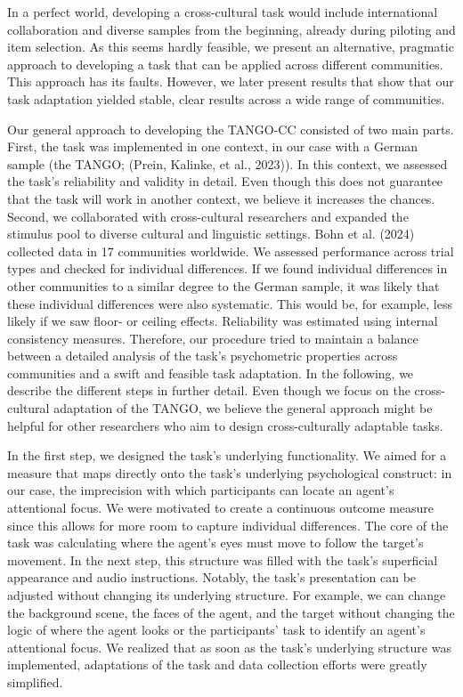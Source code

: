\documentclass[
  man,mask,floatsintext]{apa7}
\begin{document}
In a perfect world, developing a cross-cultural task would include international collaboration and diverse samples from the beginning, already during piloting and item selection. As this seems hardly feasible, we present an alternative, pragmatic approach to developing a task that can be applied across different communities. This approach has its faults. However, we later present results that show that our task adaptation yielded stable, clear results across a wide range of communities.

Our general approach to developing the TANGO-CC consisted of two main parts. First, the task was implemented in one context, in our case with a German sample (the TANGO; (Prein, Kalinke, et al., 2023)). In this context, we assessed the task's reliability and validity in detail. Even though this does not guarantee that the task will work in another context, we believe it increases the chances. Second, we collaborated with cross-cultural researchers and expanded the stimulus pool to diverse cultural and linguistic settings. Bohn et al. (2024) collected data in 17 communities worldwide. We assessed performance across trial types and checked for individual differences. If we found individual differences in other communities to a similar degree to the German sample, it was likely that these individual differences were also systematic. This would be, for example, less likely if we saw floor- or ceiling effects. Reliability was estimated using internal consistency measures. Therefore, our procedure tried to maintain a balance between a detailed analysis of the task's psychometric properties across communities and a swift and feasible task adaptation. In the following, we describe the different steps in further detail. Even though we focus on the cross-cultural adaptation of the TANGO, we believe the general approach might be helpful for other researchers who aim to design cross-culturally adaptable tasks.

In the first step, we designed the task's underlying functionality. We aimed for a measure that maps directly onto the task's underlying psychological construct: in our case, the imprecision with which participants can locate an agent's attentional focus. We were motivated to create a continuous outcome measure since this allows for more room to capture individual differences. The core of the task was calculating where the agent's eyes must move to follow the target's movement. In the next step, this structure was filled with the task's superficial appearance and audio instructions. Notably, the task's presentation can be adjusted without changing its underlying structure. For example, we can change the background scene, the faces of the agent, and the target without changing the logic of where the agent looks or the participants' task to identify an agent's attentional focus. We realized that as soon as the task's underlying structure was implemented, adaptations of the task and data collection efforts were greatly simplified.
\end{document}
